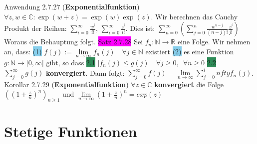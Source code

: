 \documentclass[landscape, 10pt]{article}
\newcommand{\R}{\mathbb{R}}
\newcommand{\N}{\mathbb{N}}
\newcommand{\C}{\mathbb{C}}
\begin{document}
\begin{multicols}{3}
              \colorbox{Dandelion}{Anwendung 2.7.27 } (\textbf{Exponentialfunktion})
                     $\forall z,w\in\C:\exp(w+z)
                     =\exp(w)\exp(z)$. Wir berechnen das Cauchy Produkt der 
                     Reihen: $\sum_{i=0}^\infty\frac{w^i}{i!}$,
                     $\sum_{i=0}^\infty\frac{z^i}{i!}$.
                     Dies ist:
                     $\sum_{n=0}^\infty(\sum_{j=0}^n\frac{w^{n-j}}{(n-j)!}
                     \frac{z^j}{j!})$ Woraus die Behauptung folgt.
              \colorbox{magenta}{Satz 2.7.28} Sei 
                     \textcolor{NavyBlue}{$f_n:\N\longrightarrow\R$} eine Folge. 
                     Wir nehmen an, dass: 
                     \colorbox{SkyBlue}{(1)} 
                     \textcolor{NavyBlue}{
                     $f(j):=\lim\limits_{n\to\infty}f_n(j)\quad\forall j\in\N$} 
                     existiert 
                     \colorbox{SkyBlue}{(2)} es eine Funktion 
                     \textcolor{NavyBlue}{$g:\N\longrightarrow[0,\infty[$} gibt,
                     so dass \colorbox{SeaGreen}{2.1} 
                     \textcolor{NavyBlue}{$|f_n(j)\leqslant g(j)\quad\forall j\geqslant0,\enspace
                     \forall n\geqslant0$} 
                     \colorbox{SeaGreen}{2.2} \textcolor{NavyBlue}{$\sum_{j=0}^\infty g(j)$} 
                     \textbf{konvergiert}. Dann folgt: 
                     \textcolor{NavyBlue}{
                     $\sum_{j=0}^\infty f(j)=\lim\limits_{n\to\infty}\sum_{j=0}^infty f_n(j)$}.
              \colorbox{BurntOrange}{Korollar 2.7.29} (\textbf{Exponentialfunktion})
                     \textcolor{NavyBlue}{$\forall z\in\C$} \textbf{konvergiert} die Folge 
                     \textcolor{NavyBlue}{$((1+\frac{z}{n})^n)_{n\geqslant1}$} und 
                     \textcolor{NavyBlue}{$\lim\limits_{n\to\infty}(1+\frac{z}{n})^n=exp(z)$}

\section{Stetige Funktionen}

\end{multicols}
\end{document}
